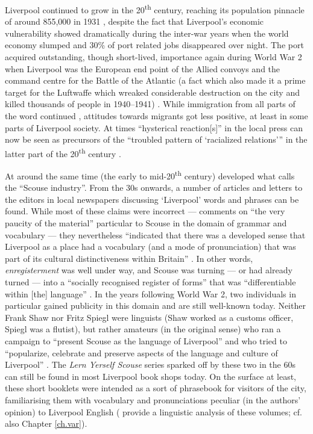 Liverpool continued to grow in the 20\textsuperscript{th} century, reaching its population pinnacle of around 855,000 in 1931 \citep[cf.][171]{pooley2006}, despite the fact that Liverpool's economic vulnerability showed dramatically during the inter-war years when the world economy slumped and 30\% of port related jobs disappeared over night.
The port acquired outstanding, though short-lived, importance again during World War 2 when Liverpool was the European end point of the Allied convoys and the command centre for the Battle of the Atlantic (a fact which also made it a prime target for the Luftwaffe which wreaked considerable destruction on the city and killed thousands of people in 1940--1941) \citep[cf.][393 and 405]{murden2006}.
While immigration from all parts of the word continued \citep[cf.][119]{honeybone2007}, attitudes towards migrants got less positive, at least in some parts of Liverpool society.
At times ``hysterical reaction[s]'' in the local press can now be seen as precursors of the ``troubled pattern of `racialized relations''' in the latter part of the 20\textsuperscript{th} century \citep[cf.][23]{belchem2006a}.

At around the same time (the early to mid-20\textsuperscript{th} century) developed what \citet[40]{crowley2012} calls the ``Scouse industry''.
From the 30s onwards, a number of articles and letters to the editors in local newspapers discussing `Liverpool' words and phrases can be found.
While most of these claims were incorrect --- \citet[48]{knowles1973} comments on ``the very paucity of the material'' particular to Scouse in the domain of grammar and vocabulary --- they nevertheless ``indicated that there was a developed sense that Liverpool as a place had a vocabulary (and a mode of pronunciation) that was part of its cultural distinctiveness within Britain'' \citeyearpar[42]{crowley2012}.
In other words, \emph{enregisterment} was well under way, and Scouse was turning --- or had already turned --- into a ``socially recognised register of forms'' that was ``differentiable within [the] language'' \parencite[231]{agha2003}.
In the years following World War 2, two individuals in particular gained publicity in this domain and are still well-known today.
Neither Frank Shaw nor Fritz Spiegl were linguists (Shaw worked as a customs officer, Spiegl was a flutist), but rather amateurs (in the original sense) who ran a campaign to ``present Scouse as the language of Liverpool'' and who tried to ``popularize, celebrate and preserve aspects of the language and culture of Liverpool'' \citep[64--65]{crowley2012}.
The \emph{Lern Yerself Scouse} series sparked off by these two in the 60s can still be found in most Liverpool book shops today.
On the surface at least, these short booklets were intended as a sort of phrasebook for visitors of the city, familiarising them with vocabulary and pronunciations peculiar (in the authors' opinion) to Liverpool English (\citet{honeybonewatson2013} provide a linguistic analysis of these volumes; cf. also Chapter \ref{ch.var}).

